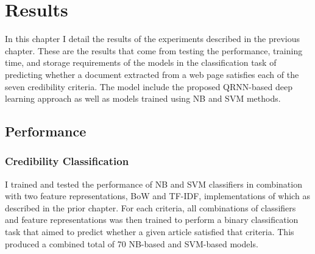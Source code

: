 \documentclass[a4paper,twoside,phd]{BYUPhys}
\begin{document}
\chapter{Results}
\label{chap:Results}

In this chapter I detail the results of the experiments described in the previous chapter. These are the results that come from testing the performance, training time, and storage requirements of the models in the classification task of predicting whether a document extracted from a web page satisfies each of the seven credibility criteria. The model include the proposed QRNN-based deep learning approach as well as models trained using NB and SVM methods.

\section{Performance}
\label{sec:AccuracyResults}
\subsection{Credibility Classification}
\label{sec:CredibilityClassificationResults}

I trained and tested the performance of NB and SVM classifiers in combination with two feature representations, BoW and TF-IDF, implementations of which as described in the prior chapter. For each criteria, all combinations of classifiers and feature representations was then trained to perform a binary classification task that aimed to predict whether a given article satisfied that criteria. This produced a combined total of 70 NB-based and SVM-based models. \newline
\end{document}
